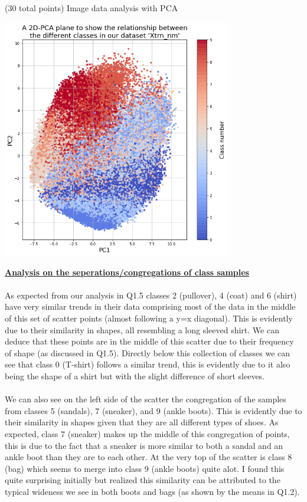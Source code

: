 \documentclass[12pt]{article}
\begin{document}
\begin{question}{(30 total points) Image data analysis with PCA}
\begin{subquestion}
   

      \begin{answerbox}{52.5em}
        \begin{center}
        \includegraphics[width=0.75\textwidth]{images/q18.png}
        \end{center}
        \footnotesize{\textbf{\underline{Analysis on the seperations/congregations of class samples}}}\\
        \\
        \scriptsize{
        As expected from our analysis in Q1.5 classes 2 (pullover), 4 (coat) and 6 (shirt) have very similar trends in their data comprising most of the data in the middle of this set of scatter points (almost following a y=x diagonal). This is evidently due to their similarity in shapes, all resembling a long sleeved shirt. We can deduce that these points are in the middle of this scatter due to their frequency of shape (as discussed in Q1.5). Directly below this collection of classes we can see that class 0 (T-shirt) follows a similar trend, this is evidently due to it also being the shape of a shirt but with the slight difference of short sleeves.\\
\\
        We can also see on the left side of the scatter the congregation of the samples from classes 5 (sandals), 7 (sneaker), and 9 (ankle boots). This is evidently due to their similarity in shapes given that they are all different types of shoes. As expected, class 7 (sneaker) makes up the middle of this congregation of points, this is due to the fact that a sneaker is more similar to both a sandal and an ankle boot than they are to each other. At the very top of the scatter is class 8 (bag) which seems to merge into class 9 (ankle boots) quite alot. I found this quite surprising initially but realized this similarity can be attributed to the typical wideness we see in both boots and bags (as shown by the means in Q1.2).\\
}
\end{answerbox}
\end{subquestion}
\end{question}
\end{document}
